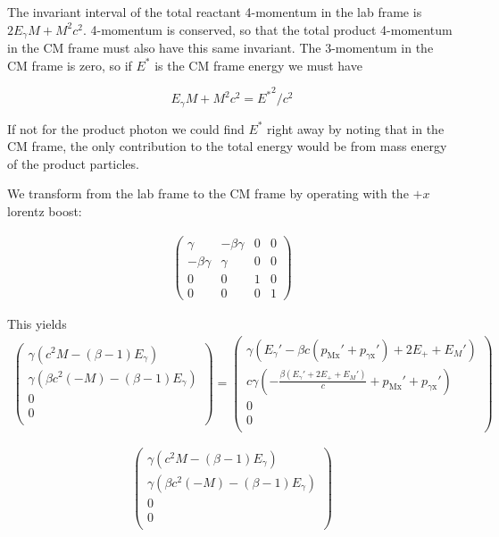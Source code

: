 \documentclass[12pt]{article}
\begin{document}
The invariant interval of the total reactant 4-momentum in the lab frame is \(2E_\gamma M + M^2 c^2\). 4-momentum is conserved, so that the total product 4-momentum in the CM frame must also have this same invariant. The 3-momentum in the CM frame is zero, so if \(E^*\) is the CM frame energy we must have

\[E_\gamma M + M^2 c^2 = {E^*}^2/c^2
\] 

If not for the product photon we could find \(E^*\) right away by noting that in the CM frame, the only contribution to the total energy would be from mass energy of the product particles.




We transform from the lab frame to the CM frame by operating with the \(+x\) lorentz boost:

\begin{align*}
\left(\begin{matrix}
\gamma & -\beta\gamma &0&0\\
-\beta\gamma &\gamma &0&0 \\
0&0&1&0 \\
0&0&0&1
\end{matrix}\right)
\end{align*}

This yields \\
\begin{align*}
\left(
\begin{array}{c}
 \gamma  \left(c^2 M-(\beta -1) E_{\gamma }\right) \\
 \gamma  \left(\beta  c^2 (-M)-(\beta -1) E_{\gamma }\right)
   \\
 0 \\
 0 \\
\end{array}
\right)=
\left(
\begin{array}{c}
 \gamma  \left(E_{\gamma }'-\beta  c
   \left(p_{\text{Mx}}'+p_{\text{$\gamma $x}}'\right)+2
   E_++E_M'\right) \\
 c \gamma  \left(-\frac{\beta  \left(E_{\gamma }'+2
   E_++E_M'\right)}{c}+p_{\text{Mx}}'+p_{\text{$\gamma
   $x}}'\right) \\
 0 \\
 0 \\
\end{array}
\right)
\end{align*}

\[\left(
\begin{array}{c}
 \gamma  \left(c^2 M-(\beta -1)
   E_{\gamma }\right) \\
 \gamma  \left(\beta  c^2
   (-M)-(\beta -1) E_{\gamma
   }\right) \\
 0 \\
 0 \\
\end{array}
\right)
\]
\end{document}

